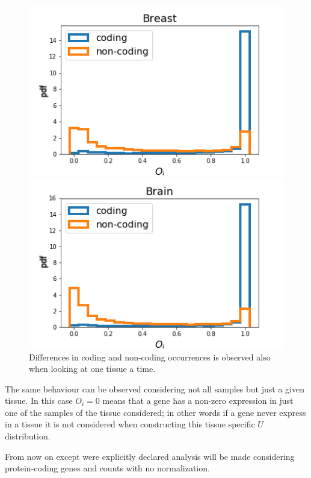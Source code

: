 \begin{figure}[htb!]
    \centering
    \begin{minipage}{0.45\textwidth}
    \includegraphics[width=0.95\linewidth]{pictures/structure/gtex/U_Breast.png}
    \end{minipage}
    \hspace{2mm}
    \begin{minipage}{0.45\textwidth}
    \includegraphics[width=0.95\linewidth]{pictures/structure/gtex/U_Brain.png}
    \end{minipage}
    \caption{Differences in coding and non-coding occurrences is observed also when looking at one tissue a time.}
    \label{fig:structure/gtex/U_tissues}
\end{figure}

The same behaviour can be observed considering not all samples but just a given tissue. In this case $O_i=0$ means that a gene has a non-zero expression in just one of the samples of the tissue considered; in other words if a gene never express in a tissue it is not considered when constructing this tissue specific $U$ distribution.

From now on except were explicitly declared analysis will be made considering protein-coding genes and counts with no normalization.
